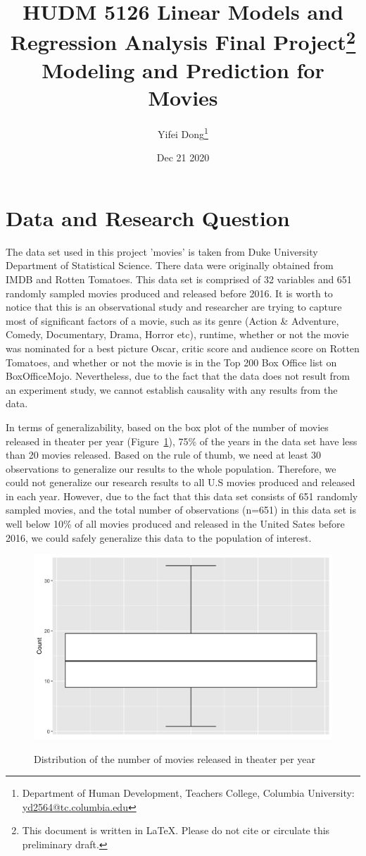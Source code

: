\documentclass{article}
\title{HUDM 5126 Linear Models and Regression Analysis Final Project\footnote{This document is written in \LaTeX. Please do not cite or circulate this preliminary draft.}\\
Modeling and Prediction for Movies}
\author{Yifei Dong\footnote{Department of Human Development, Teachers College, Columbia University: \href{mailto: yd2564@tc.columbia.edu}{yd2564@tc.columbia.edu}}}
\date{Dec 21 2020}
\begin{document}
\maketitle

\section{Data and Research Question}
\smallskip
The data set used in this project 'movies' is taken from Duke University Department of Statistical Science. There data were originally obtained from IMDB and Rotten Tomatoes. This data set is comprised of 32 variables and 651 randomly sampled movies produced and released before 2016. It is worth to notice that this is an observational study and researcher are trying to capture most of significant factors of a movie, such as its genre (Action \& Adventure, Comedy, Documentary, Drama, Horror etc), runtime, whether or not the movie was nominated for a best picture Oscar, critic score and audience score on Rotten Tomatoes, and whether or not the movie is in the Top 200 Box Office list on BoxOfficeMojo. Nevertheless, due to the fact that the data does not result from an experiment study, we cannot establish causality with any results from the data. 

In terms of generalizability, based on the box plot of the number of movies released in theater
per year (Figure~\ref{fig: 1}), 75\% of the years in  the data set have less than 20 movies
released. Based on the rule of thumb, we need at least 30 observations to generalize our results 
to the whole population. Therefore, we could not generalize our research results to all U.S movies 
produced and released in each year. However, due to the fact that this data set consists of 651 
randomly sampled movies, and the total number of observations (n=651) in this data set is well 
below 10\% of all movies produced and released in the United Sates before 2016, we could 
safely generalize this data to the population of interest. 

\begin{figure}[htbp]
\begin{center}
\caption{Distribution of the number of movies released in theater per year}
\includegraphics[scale=0.3]{data_a.png}
\label{fig: 1}
\end{center}
\end{figure}
\end{document}
